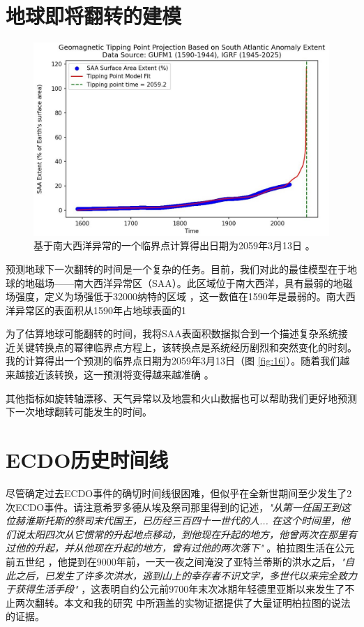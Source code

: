 \documentclass[10pt,twocolumn,letterpaper]{article}
\begin{document}
\section{地球即将翻转的建模}

\begin{figure}[b]
\begin{center}
   \includegraphics[width=1\linewidth]{saa-crop.jpeg}
\end{center}
   \caption{基于南大西洋异常的一个临界点计算得出日期为2059年3月13日 \cite{125,126}。}
\label{fig:16}
\label{fig:onecol}
\end{figure}

预测地球下一次翻转的时间是一个复杂的任务。目前，我们对此的最佳模型在于地球的地磁场——南大西洋异常区（SAA）。此区域位于南大西洋，具有最弱的地磁场强度，定义为场强低于32000纳特的区域 \cite{135}，这一数值在1590年是最弱的。南大西洋异常区的表面积从1590年占地球表面的1%

为了估算地球可能翻转的时间，我将SAA表面积数据拟合到一个描述复杂系统接近关键转换点的幂律临界点方程上，该转换点是系统经历剧烈和突然变化的时刻。我的计算得出一个预测的临界点日期为2059年3月13日（图 \ref{fig:16}）。随着我们越来越接近该转换，这一预测将变得越来越准确 \cite{136}。

其他指标如旋转轴漂移、天气异常以及地震和火山数据也可以帮助我们更好地预测下一次地球翻转可能发生的时间。

\section{ECDO历史时间线}

尽管确定过去ECDO事件的确切时间线很困难，但似乎在全新世期间至少发生了2次ECDO事件。请注意希罗多德从埃及祭司那里得到的记述，\textit{"从第一任国王到这位赫淮斯托斯的祭司末代国王，已历经三百四十一世代的人... 在这个时间里，他们说太阳四次从它惯常的升起地点移动，到他现在升起的地方，他曾两次在那里有过他的升起，并从他现在升起的地方，曾有过他的两次落下"} \cite{32}。柏拉图生活在公元前五世纪 \cite{111}，他提到在9000年前，一天一夜之间淹没了亚特兰蒂斯的洪水之后，\textit{"自此之后，已发生了许多次洪水，逃到山上的幸存者不识文字，多世代以来完全致力于获得生活手段"} \cite{112}，这表明自约公元前9700年末次冰期年轻德里亚斯以来发生了不止两次翻转。本文和我的研究 \cite{2} 中所涵盖的实物证据提供了大量证明柏拉图的说法的证据。
\end{document}
